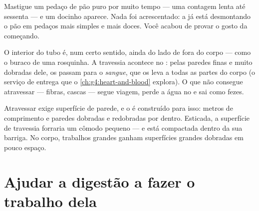 \begin{example}\label{ex:g4:journey-of-food:sweet}
Mastigue um pedaço de pão puro por muito tempo --- uma contagem
lenta até sessenta --- e um docinho aparece. Nada foi acrescentado:
a  já está desmontando o pão em pedaços mais simples e mais
doces. Você acabou de provar o gosto da  começando.
\end{example}

\begin{proposition}\label{prop:g4:journey-of-food:absorb}
O interior do tubo é, num certo sentido, ainda do lado de fora do
corpo --- como o buraco de uma rosquinha. A travessia acontece no
\emph{}: pelas paredes finas e muito dobradas dele,
os  passam para o \emph{sangue}, que os leva
a todas as partes do corpo (o serviço de entrega que o
\cref{ch:g4:heart-and-blood} explora). O que não consegue atravessar
--- fibras, cascas --- segue viagem, perde a água no 
e sai como fezes.
\end{proposition}
\admitted

\begin{remark}\label{rem:g4:journey-of-food:surface}
Atravessar exige superfície de parede, e o  é
construído para isso: metros de comprimento e paredes dobradas e
redobradas por dentro. Esticada, a superfície de travessia forraria
um cômodo pequeno --- e está compactada dentro da sua barriga. No
corpo, trabalhos grandes ganham superfícies grandes dobradas em
pouco espaço.
\end{remark}

\section{Ajudar a digestão a fazer o trabalho dela}

